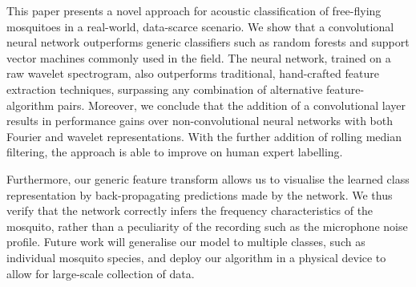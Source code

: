 \documentclass[10pt, twocolumn]{llncs}
\newcommand{\ikN}[1]{\todo[inline, size=\small, color=orange!30]{[ik] #1}}
\begin{document}

This paper presents a novel approach for acoustic classification of free-flying mosquitoes in a real-world, data-scarce scenario. We show that a convolutional neural network outperforms generic classifiers such as random forests and support vector machines commonly used in the field. The neural network, trained on a raw wavelet spectrogram, also outperforms traditional, hand-crafted feature extraction techniques, surpassing any combination of alternative feature-algorithm pairs. Moreover, we conclude that the addition of a convolutional layer results in performance gains over non-convolutional neural networks with both Fourier and wavelet representations. With the further addition of rolling median filtering, the approach is able to improve on human expert labelling.


Furthermore, our generic feature transform allows us to visualise the learned class representation by back-propagating predictions made by the network. We thus verify that the network correctly infers the frequency characteristics of the mosquito, rather than a peculiarity of the recording such as the microphone noise profile. Future work will generalise our model to multiple classes, such as individual mosquito species, and deploy our algorithm in a physical device to allow for large-scale collection of data. 
\end{document}
